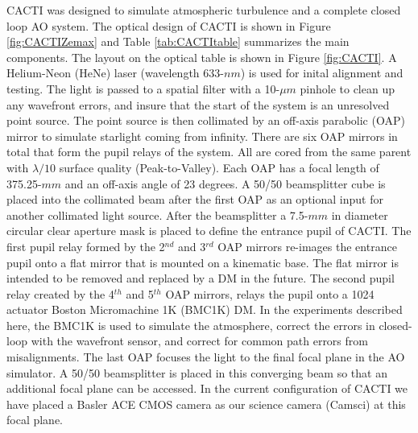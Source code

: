 \documentclass[12pt]{spieman}  %
\begin{document}
\begin{spacing}{2}
CACTI was designed to simulate atmospheric turbulence and a complete closed loop AO system. The optical design of  CACTI  is shown in Figure \ref{fig:CACTIZemax} and Table \ref{tab:CACTItable} summarizes the main components. The layout on the optical table is shown in Figure \ref{fig:CACTI}. A Helium-Neon (HeNe) laser (wavelength 633-$nm$) is used for inital alignment and testing.  The light is passed to a spatial filter with a 10-$\mu m$ pinhole to clean up any wavefront errors, and insure that the start of the system is an unresolved point source. The point source is then collimated by an off-axis parabolic (OAP) mirror to simulate starlight coming from infinity. There are six OAP mirrors in total that form the pupil relays of the system. All are cored from the same parent with $\lambda /10$ surface quality (Peak-to-Valley). Each OAP has a focal length of 375.25-$mm$ and an off-axis angle of 23 degrees. A 50/50 beamsplitter cube is placed into the collimated beam after the first OAP as an optional input for another collimated light source. After the beamsplitter a 7.5-$mm$ in diameter circular clear aperture mask is placed to define the entrance pupil of CACTI. The first pupil relay formed by the 2$^{nd}$ and 3$^{rd}$ OAP mirrors re-images the entrance pupil onto a flat mirror that is mounted on a kinematic base. The flat mirror is intended to be removed and replaced by a DM in the future. The second pupil relay created by the 4$^{th}$ and 5$^{th}$ OAP mirrors, relays the pupil onto a 1024 actuator Boston Micromachine 1K (BMC1K) DM. In the experiments described here, the BMC1K is used to simulate the atmosphere, correct the errors in closed-loop with the wavefront sensor, and correct for common path errors from misalignments. The last OAP focuses the light to the final focal plane in the AO simulator. A 50/50 beamsplitter is placed in this converging beam so that an additional focal plane can be accessed. In the current configuration of CACTI we have placed a Basler ACE CMOS camera as our science camera (Camsci) at this focal plane.


\end{spacing}
\end{document}
